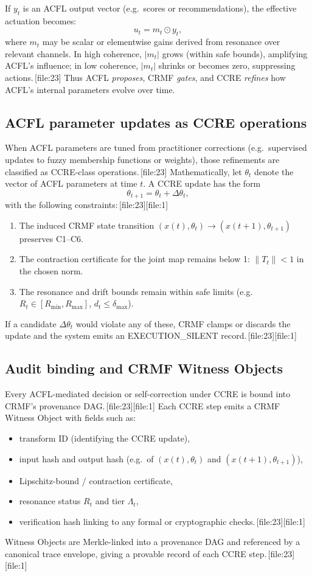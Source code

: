 \documentclass[11pt]{article}
\begin{document}
If $y_t$ is an ACFL output vector (e.g.\ scores or recommendations), the effective actuation becomes:
\[
  u_t = m_t \odot y_t,
\]
where $m_t$ may be scalar or elementwise gains derived from resonance over relevant channels.
In high coherence, $|m_t|$ grows (within safe bounds), amplifying ACFL's influence; in low coherence, $|m_t|$ shrinks or becomes zero, suppressing actions.\,[file:23]
Thus ACFL \emph{proposes}, CRMF \emph{gates}, and CCRE \emph{refines} how ACFL's internal parameters evolve over time.

\subsection{ACFL parameter updates as CCRE operations}

When ACFL parameters are tuned from practitioner corrections (e.g.\ supervised updates to fuzzy membership functions or weights), those refinements are classified as CCRE-class operations.\,[file:23]
Mathematically, let $\theta_t$ denote the vector of ACFL parameters at time $t$.
A CCRE update has the form
\[
  \theta_{t+1} = \theta_t + \Delta\theta_t,
\]
with the following constraints:\,[file:23][file:1]
\begin{enumerate}[leftmargin=1.5em]
  \item The induced CRMF state transition $(x(t),\theta_t)\to(x(t+1),\theta_{t+1})$ preserves C1--C6.
  \item The contraction certificate for the joint map remains below 1: $\|T_t\| < 1$ in the chosen norm.
  \item The resonance and drift bounds remain within safe limits (e.g.\ $R_t\in[R_{\min},R_{\max}]$, $d_t\le\delta_{\max}$).
\end{enumerate}
If a candidate $\Delta\theta_t$ would violate any of these, CRMF clamps or discards the update and the system emits an EXECUTION\_SILENT record.\,[file:23][file:1]

\subsection{Audit binding and CRMF Witness Objects}

Every ACFL-mediated decision or self-correction under CCRE is bound into CRMF's provenance DAG.\,[file:23][file:1]
Each CCRE step emits a CRMF Witness Object with fields such as:
\begin{itemize}[leftmargin=1.5em]
  \item transform ID (identifying the CCRE update),
  \item input hash and output hash (e.g.\ of $(x(t),\theta_t)$ and $(x(t+1),\theta_{t+1})$),
  \item Lipschitz-bound / contraction certificate,
  \item resonance status $R_t$ and tier $\Lambda_t$,
  \item verification hash linking to any formal or cryptographic checks.\,[file:23][file:1]
\end{itemize}
Witness Objects are Merkle-linked into a provenance DAG and referenced by a canonical trace envelope, giving a provable record of each CCRE step.\,[file:23][file:1]
\end{document}
